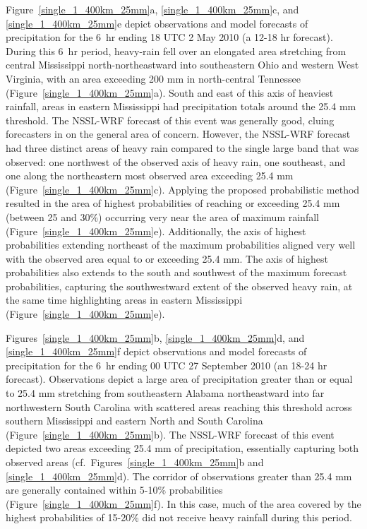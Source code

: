\mbox{Figure \ref{single_1_400km_25mm}a}, \mbox{\ref{single_1_400km_25mm}c}, and \mbox{\ref{single_1_400km_25mm}e} depict observations and model forecasts of precipitation for the \mbox{6 hr} ending 18 UTC 2 May 2010 (a 12-18 hr forecast).
During this \mbox{6 hr} period, heavy-rain fell over an elongated area stretching from central Mississippi north-northeastward into southeastern Ohio and western West Virginia, with an area exceeding 200 mm in north-central Tennessee \mbox{(Figure \ref{single_1_400km_25mm}a)}.
South and east of this axis of heaviest rainfall, areas in eastern Mississippi had precipitation totals around the 25.4 mm threshold.
The NSSL-WRF forecast of this event was generally good, cluing forecasters in on the general area of concern.
However, the NSSL-WRF forecast had three distinct areas of heavy rain compared to the single large band that was observed: one northwest of the observed axis of heavy rain, one southeast, and one along the northeastern most observed area exceeding 25.4 mm \mbox{(Figure \ref{single_1_400km_25mm}c)}.
Applying the proposed probabilistic method resulted in the area of highest probabilities of reaching or exceeding 25.4 mm (between 25 and 30\%) occurring very near the area of maximum rainfall \mbox{(Figure \ref{single_1_400km_25mm}e)}.
Additionally, the axis of highest probabilities extending northeast of the maximum probabilities aligned very well with the observed area equal to or exceeding 25.4 mm.
The axis of highest probabilities also extends to the south and southwest of the maximum forecast probabilities, capturing the southwestward extent of the observed heavy rain, at the same time highlighting areas in eastern Mississippi \mbox{(Figure \ref{single_1_400km_25mm}e)}.


\mbox{Figures \ref{single_1_400km_25mm}b}, \mbox{\ref{single_1_400km_25mm}d}, and \mbox{\ref{single_1_400km_25mm}f} depict observations and model forecasts of precipitation for the \mbox{6 hr} ending 00 UTC 27 September 2010 (an 18-24 hr forecast).
Observations depict a large area of precipitation greater than or equal to 25.4 mm stretching from southeastern Alabama northeastward into far northwestern South Carolina with scattered areas reaching this threshold across southern Mississippi and eastern North and South Carolina \mbox{(Figure \ref{single_1_400km_25mm}b)}.
The NSSL-WRF forecast of this event depicted two areas exceeding 25.4 mm of precipitation, essentially capturing both observed areas (\mbox{cf. Figures \ref{single_1_400km_25mm}b} and \mbox{\ref{single_1_400km_25mm}d)}.
The corridor of observations greater than 25.4 mm are generally contained within 5-10\% probabilities \mbox{(Figure \ref{single_1_400km_25mm}f)}. In this case, much of the area covered by the highest probabilities of 15-20\% did not receive heavy rainfall during this period.


